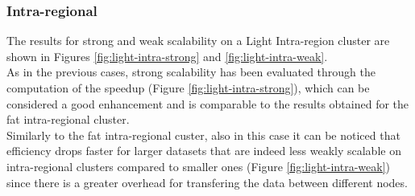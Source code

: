 \documentclass[final,5p,times,twocolumn,authoryear]{elsarticle}
\begin{document}
\subsubsection{Intra-regional}
The results for strong and weak scalability on a Light Intra-region cluster are shown in Figures \ref{fig:light-intra-strong} and \ref{fig:light-intra-weak}. \\
As in the previous cases, strong scalability has been evaluated through the computation of the speedup (Figure \ref{fig:light-intra-strong}), which can be considered a good enhancement and is comparable to the results obtained for the fat intra-regional cluster. \\
Similarly to the fat intra-regional custer, also in this case it can be noticed that efficiency drops faster for larger datasets that are indeed less weakly scalable on intra-regional clusters compared to smaller ones (Figure \ref{fig:light-intra-weak}) since there is a greater overhead for transfering the data between different nodes.
\end{document}

